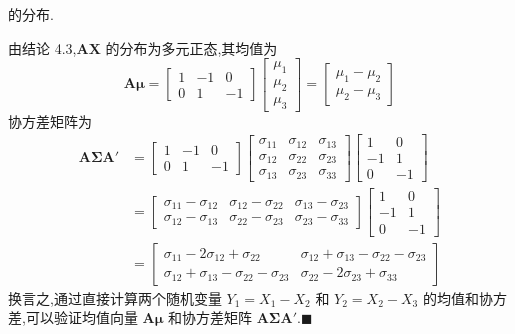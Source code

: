 的分布.

由结论 4.3,$\mathbf{A}\mathbf{X}$ 的分布为多元正态,其均值为
\[
\mathbf{A}\boldsymbol{\mu}=\begin{bmatrix}1&-1&0\\0&1&-1\end{bmatrix}\begin{bmatrix}\mu_1\\\mu_2\\\mu_3\end{bmatrix}=\begin{bmatrix}\mu_1-\mu_2\\\mu_2-\mu_3\end{bmatrix}
\]
协方差矩阵为
\begin{align*}
\mathbf{A}\boldsymbol{\Sigma}\mathbf{A}'&=\begin{bmatrix}1&-1&0\\0&1&-1\end{bmatrix}\begin{bmatrix}\sigma_{11}&\sigma_{12}&\sigma_{13}\\\sigma_{12}&\sigma_{22}&\sigma_{23}\\\sigma_{13}&\sigma_{23}&\sigma_{33}\end{bmatrix}\begin{bmatrix}1&0\\-1&1\\0&-1\end{bmatrix}\\
&=\begin{bmatrix}\sigma_{11}-\sigma_{12}&\sigma_{12}-\sigma_{22}&\sigma_{13}-\sigma_{23}\\\sigma_{12}-\sigma_{13}&\sigma_{22}-\sigma_{23}&\sigma_{23}-\sigma_{33}\end{bmatrix}\begin{bmatrix}1&0\\-1&1\\0&-1\end{bmatrix}\\
&=\begin{bmatrix}\sigma_{11}-2\sigma_{12}+\sigma_{22}&\sigma_{12}+\sigma_{13}-\sigma_{22}-\sigma_{23}\\\sigma_{12}+\sigma_{13}-\sigma_{22}-\sigma_{23}&\sigma_{22}-2\sigma_{23}+\sigma_{33}\end{bmatrix}
\end{align*}
换言之,通过直接计算两个随机变量 $Y_1=X_1-X_2$ 和 $Y_2=X_2-X_3$ 的均值和协方差,可以验证均值向量 $\mathbf{A}\boldsymbol{\mu}$ 和协方差矩阵 $\mathbf{A}\boldsymbol{\Sigma}\mathbf{A}'$.\hfill$\blacksquare$

